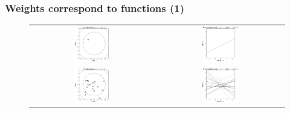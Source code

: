 \begin{frame}
\frametitle{Weights correspond to functions (1)}
\begin{figure}
\begin{tabular}{cc}
    \includegraphics[width=0.3\textwidth]{images/plots/w_space_prior_sequence_001_prior.pdf} &
    \includegraphics[width=0.3\textwidth]{images/plots/w_space_prior_sequence_001_functions.pdf} \\
    
    \includegraphics[width=0.3\textwidth]{images/plots/w_space_prior_sequence_019_prior.pdf} &
    \includegraphics[width=0.3\textwidth]{images/plots/w_space_prior_sequence_019_functions.pdf}
\end{tabular}
\end{figure}
\end{frame}


